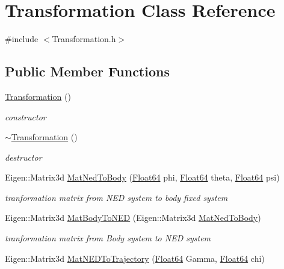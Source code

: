 \hypertarget{class_transformation}{}\section{Transformation Class Reference}
\label{class_transformation}


{\ttfamily \#include $<$Transformation.\+h$>$}

\subsection*{Public Member Functions}
\begin{DoxyCompactItemize}
\item 
\hyperlink{class_transformation_a40ab64d41c752804740e972ef5f2479f}{Transformation} ()
\begin{DoxyCompactList}\small\item\em constructor \end{DoxyCompactList}\item 
\hyperlink{class_transformation_ade11a9f133b2acd81ae9383187cc255e}{$\sim$\+Transformation} ()
\begin{DoxyCompactList}\small\item\em destructor \end{DoxyCompactList}\item 
Eigen\+::\+Matrix3d \hyperlink{class_transformation_ab33befedbf4f290a0c03367a7fb23e6e}{Mat\+Ned\+To\+Body} (\hyperlink{group___tools_ga3f1431cb9f76da10f59246d1d743dc2c}{Float64} phi, \hyperlink{group___tools_ga3f1431cb9f76da10f59246d1d743dc2c}{Float64} theta, \hyperlink{group___tools_ga3f1431cb9f76da10f59246d1d743dc2c}{Float64} psi)
\begin{DoxyCompactList}\small\item\em tranformation matrix from N\+ED system to body fixed system \end{DoxyCompactList}\item 
Eigen\+::\+Matrix3d \hyperlink{class_transformation_a2c16407225610227ee0c9d2fd2242a29}{Mat\+Body\+To\+N\+ED} (Eigen\+::\+Matrix3d \hyperlink{class_transformation_ab33befedbf4f290a0c03367a7fb23e6e}{Mat\+Ned\+To\+Body})
\begin{DoxyCompactList}\small\item\em tranformation matrix from Body system to N\+ED system \end{DoxyCompactList}\item 
Eigen\+::\+Matrix3d \hyperlink{class_transformation_aaab0c8669b3addd4fc04cd69640c14ec}{Mat\+N\+E\+D\+To\+Trajectory} (\hyperlink{group___tools_ga3f1431cb9f76da10f59246d1d743dc2c}{Float64} Gamma, \hyperlink{group___tools_ga3f1431cb9f76da10f59246d1d743dc2c}{Float64} chi)

\end{DoxyCompactItemize}
